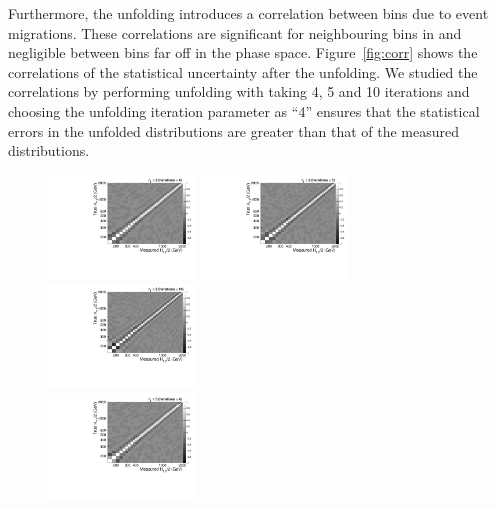 Furthermore, the unfolding introduces a correlation between bins due to event migrations. These correlations are significant for neighbouring bins in \httwo and negligible between bins far off in the phase space. Figure~\ref{fig:corr} shows the correlations of the statistical uncertainty after the unfolding. We studied the correlations by performing unfolding with taking 4, 5 and 10 iterations and choosing the unfolding iteration parameter as ``4'' ensures that the statistical errors in the unfolded distributions are greater than that of the measured distributions. 

\begin{figure}[h]
  \begin{center}
    \includegraphics[width=0.35\textwidth]{Plots_HT_2_150/Correlation_Matrix_NLO_2_ite4.pdf}%
    \includegraphics[width=0.35\textwidth]{Plots_HT_2_150/Correlation_Matrix_NLO_2_ite5.pdf}%
    \includegraphics[width=0.35\textwidth]{Plots_HT_2_150/Correlation_Matrix_NLO_2_ite10.pdf}\\
    \vspace{5mm}
    \includegraphics[width=0.35\textwidth]{Plots_HT_2_150/Correlation_Matrix_NLO_3_ite4.pdf}%

\end{center}
\end{figure}
